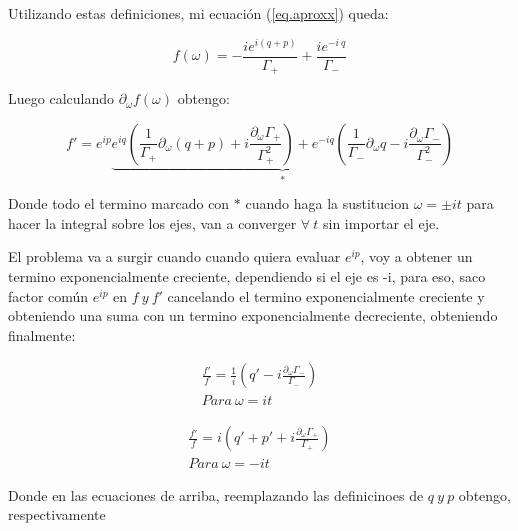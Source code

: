 Utilizando estas definiciones, mi ecuación (\ref{eq.aproxx}) queda:

\begin{equation}
    f(\omega) = - \frac{i e^{i(q+p)}}
    {\Gamma _{+}} +
    \frac{i e^{- i \ q}}
    {\Gamma _{-}}
\end{equation}

Luego calculando $\partial _{\omega} f(\omega)$ obtengo:

\begin{equation}
    f' = 
    e^ {i p}
    \underbrace
    {
    e ^{i q}
    \left(
    \frac{1}{\Gamma _{+}}  \partial _{\omega} (q+p)
    + i 
    \frac
    {\partial _{\omega} \Gamma _{+} }
    {\Gamma _{+} ^2}
    \right)    +
    e^ {-i q}
    \left(
    \frac{1}{\Gamma _{-}}  \partial _{\omega} q
    - i 
    \frac
    {\partial _{\omega} \Gamma _{-} }
    {\Gamma _{-} ^2}
    \right)
    } _{*}
\end{equation}

Donde todo el termino marcado con  $*$ cuando haga la sustitucion $\omega = \pm i t$ para hacer la integral sobre los ejes, van a converger $\forall \ t$ sin importar el eje.

El problema va a surgir cuando cuando quiera evaluar $e ^{i p}$, voy a obtener un termino exponencialmente creciente, dependiendo si el eje es -i, para eso, saco factor común $e ^{i p}$ en $f \ y \ f'$ cancelando el termino exponencialmente creciente y obteniendo una suma con un termino exponencialmente decreciente, obteniendo finalmente:

\begin{equation}
\begin{array}{c}
    \frac{f'}{f} = \frac{1}{i} 
    \left(
    q' - i 
    \frac
    {\partial _{\omega} \Gamma _{-} }
    {\Gamma _{-}}
    \right)
    \\
    Para \ \omega = i t 
\end{array}
\end{equation}
    
\begin{equation}
\begin{array}{c}
    \frac{f'}{f} = i 
    \left(
    q'+p' + i 
    \frac
    {\partial _{\omega} \Gamma _{+} }
    {\Gamma _{+}}
    \right)
    \\
    Para \ \omega = - i t 
\end{array}
\end{equation}
    
Donde en las ecuaciones de arriba, reemplazando las definicinoes de $q \ y \ p$ obtengo, respectivamente

